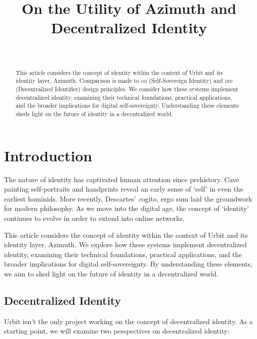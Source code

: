 \documentclass[twoside]{article}
\title{On the Utility of Azimuth and Decentralized Identity}
\author{\authorname~\authorpatp \\ \affiliation}
\date{}
\begin{document}
\maketitle
\thispagestyle{firststyle}

\begin{abstract}
  This article considers the concept of identity within the context of Urbit and its identity layer, Azimuth.  Comparison is made to \textsc{ssi} (Self-Sovereign Identity) and \textsc{did} (Decentralized Identifier) design principles.  We consider how these systems implement decentralized identity, examining their technical foundations, practical applications, and the broader implications for digital self-sovereignty.  Understanding these elements sheds light on the future of identity in a decentralized world.
\end{abstract}

\setcounter{page}{1}

\tableofcontents

\section{Introduction}

The nature of identity has captivated human attention since prehistory. Cave painting self-portraits and handprints reveal an early sense of `self' in even the earliest hominids. More recently, Descartes' {\emph cogito, ergo sum} laid the groundwork for modern philosophy. As we move into the digital age, the concept of `identity' continues to evolve in order to extend into online networks.

This article considers the concept of identity within the context of Urbit and its identity layer, Azimuth. We explore how these systems implement decentralized identity, examining their technical foundations, practical applications, and the broader implications for digital self-sovereignty. By understanding these elements, we aim to shed light on the future of identity in a decentralized world.

\subsection{Decentralized Identity}

Urbit isn't the only project working on the concept of decentralized identity. As a starting point, we will examine two perspectives on decentralized identity:
\end{document}
